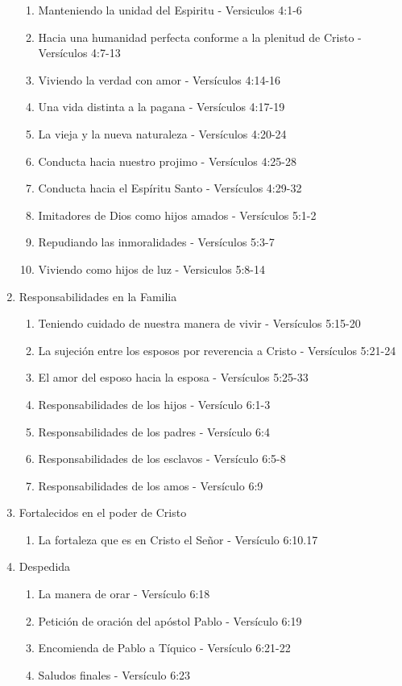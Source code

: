 \documentclass[9pt,letterpaper]{article}
\begin{document}
\begin{enumerate}
		\begin{enumerate}			
			\item Manteniendo la unidad del Espiritu - Versiculos 4:1-6			 
			\item Hacia una humanidad perfecta conforme a la plenitud de Cristo - Versículos 4:7-13
			\item Viviendo la verdad con amor - Versículos 4:14-16
			\item Una vida distinta a la pagana - Versículos 4:17-19
			\item La vieja y la nueva naturaleza - Versículos 4:20-24
			\item Conducta hacia nuestro projimo - Versículos 4:25-28
			\item Conducta hacia el Espíritu Santo - Versículos 4:29-32
			\item Imitadores de Dios como hijos amados - Versículos 5:1-2
			\item Repudiando las inmoralidades - Versículos 5:3-7
			\item Viviendo como hijos de luz - Versiculos 5:8-14
		\end{enumerate}
			\item {\large Responsabilidades en la Familia}
		\begin{enumerate}
			\item Teniendo cuidado de nuestra manera de vivir - Versículos 5:15-20
			\item La sujeción entre los esposos por reverencia a Cristo - Versículos 5:21-24
			\item El amor del esposo hacia la esposa - Versículos 5:25-33
			\item Responsabilidades de los hijos - Versículo 6:1-3
			\item Responsabilidades de los padres - Versículo 6:4
			\item Responsabilidades de los esclavos - Versículo 6:5-8
			\item Responsabilidades de los amos - Versículo 6:9
		\end{enumerate}
		\item {\large Fortalecidos en el poder de Cristo}
		\begin{enumerate}			
			\item  La fortaleza que es en Cristo el Señor - Versículo 6:10.17		
		\end{enumerate}
		\item {\large Despedida}
		\begin{enumerate}
			\item La manera de orar - Versículo 6:18
			\item Petición de oración del apóstol Pablo - Versículo 6:19
			\item Encomienda de Pablo a Tíquico - Versículo 6:21-22
			\item Saludos finales - Versículo 6:23
		\end{enumerate}	
	\end{enumerate}
\end{document}

